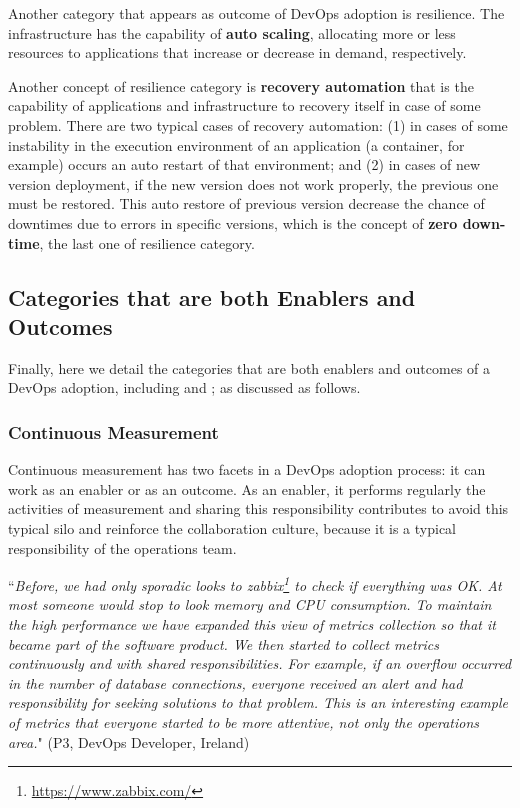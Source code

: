 Another category that appears as outcome of DevOps adoption is resilience. The
infrastructure has the capability of \textbf{auto scaling}, allocating more or
less resources to applications that increase or decrease in demand,
respectively.

Another concept of resilience category is \textbf{recovery automation} that is
the capability of applications and infrastructure to recovery itself in case of
some problem. There are two typical cases of recovery automation: (1) in cases
of some instability in the execution environment of an application (a
container, for example) occurs an auto restart of that environment; and (2) in
cases of new version deployment, if the new version does not work properly, the
previous one must be restored. This auto restore of previous version
decrease the chance of downtimes due to errors in specific versions, which
is the concept of \textbf{zero down-time}, the last one of resilience category.

\subsection{Categories that are both Enablers and Outcomes}

Finally, here we detail the categories that are both enablers
and outcomes of a DevOps adoption, including 
and ; as discussed as follows.

\subsubsection*{{\bf Continuous Measurement}}

Continuous measurement has two facets in a DevOps adoption process: it can work
as an enabler or as an outcome. As an enabler, it performs regularly the
activities of measurement and sharing this
responsibility contributes to avoid this typical silo and reinforce the
collaboration culture, because it is a typical responsibility of the operations
team.

\begin{mq}
``\emph{Before, we had only sporadic looks to
zabbix\footnote{\url{https://www.zabbix.com/}} to check if everything was OK.
At most someone would stop to look memory and CPU consumption. To maintain the
high performance we have expanded this view of metrics collection so that it
became part of the software product. We then started to collect metrics continuously
and with shared responsibilities. For example, if an overflow occurred in the
number of database connections, everyone received an alert and had
responsibility for seeking solutions to that problem. This is an interesting example of
metrics that everyone started to be more attentive, not only the operations
area.}" (P3, DevOps Developer, Ireland)
\end{mq}

